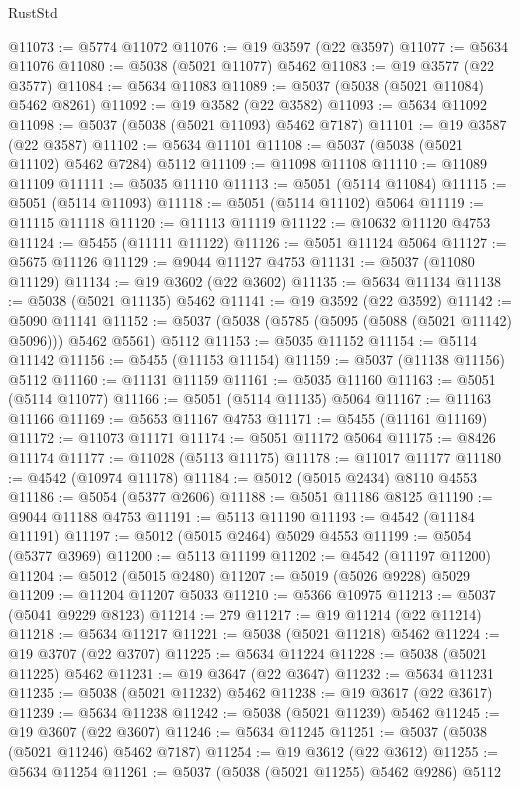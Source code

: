 \begin{lexlean}{RustStd}
\begin{coremodule}
@11073 := @5774 @11072
@11076 := @19 @3597 (@22 @3597)
@11077 := @5634 @11076
@11080 := @5038 (@5021 @11077) @5462
@11083 := @19 @3577 (@22 @3577)
@11084 := @5634 @11083
@11089 := @5037 (@5038 (@5021 @11084) @5462 @8261)
@11092 := @19 @3582 (@22 @3582)
@11093 := @5634 @11092
@11098 := @5037 (@5038 (@5021 @11093) @5462 @7187)
@11101 := @19 @3587 (@22 @3587)
@11102 := @5634 @11101
@11108 := @5037 (@5038 (@5021 @11102) @5462 @7284) @5112
@11109 := @11098 @11108
@11110 := @11089 @11109
@11111 := @5035 @11110
@11113 := @5051 (@5114 @11084)
@11115 := @5051 (@5114 @11093)
@11118 := @5051 (@5114 @11102) @5064
@11119 := @11115 @11118
@11120 := @11113 @11119
@11122 := @10632 @11120 @4753
@11124 := @5455 (@11111 @11122)
@11126 := @5051 @11124 @5064
@11127 := @5675 @11126
@11129 := @9044 @11127 @4753
@11131 := @5037 (@11080 @11129)
@11134 := @19 @3602 (@22 @3602)
@11135 := @5634 @11134
@11138 := @5038 (@5021 @11135) @5462
@11141 := @19 @3592 (@22 @3592)
@11142 := @5090 @11141
@11152 := @5037 (@5038 (@5785 (@5095 (@5088 (@5021 @11142) @5096))) @5462 @5561) @5112
@11153 := @5035 @11152
@11154 := @5114 @11142
@11156 := @5455 (@11153 @11154)
@11159 := @5037 (@11138 @11156) @5112
@11160 := @11131 @11159
@11161 := @5035 @11160
@11163 := @5051 (@5114 @11077)
@11166 := @5051 (@5114 @11135) @5064
@11167 := @11163 @11166
@11169 := @5653 @11167 @4753
@11171 := @5455 (@11161 @11169)
@11172 := @11073 @11171
@11174 := @5051 @11172 @5064
@11175 := @8426 @11174
@11177 := @11028 (@5113 @11175)
@11178 := @11017 @11177
@11180 := @4542 (@10974 @11178)
@11184 := @5012 (@5015 @2434) @8110 @4553
@11186 := @5054 (@5377 @2606)
@11188 := @5051 @11186 @8125
@11190 := @9044 @11188 @4753
@11191 := @5113 @11190
@11193 := @4542 (@11184 @11191)
@11197 := @5012 (@5015 @2464) @5029 @4553
@11199 := @5054 (@5377 @3969)
@11200 := @5113 @11199
@11202 := @4542 (@11197 @11200)
@11204 := @5012 (@5015 @2480)
@11207 := @5019 (@5026 @9228) @5029
@11209 := @11204 @11207 @5033
@11210 := @5366 @10975
@11213 := @5037 (@5041 @9229 @8123)
@11214 := 279
@11217 := @19 @11214 (@22 @11214)
@11218 := @5634 @11217
@11221 := @5038 (@5021 @11218) @5462
@11224 := @19 @3707 (@22 @3707)
@11225 := @5634 @11224
@11228 := @5038 (@5021 @11225) @5462
@11231 := @19 @3647 (@22 @3647)
@11232 := @5634 @11231
@11235 := @5038 (@5021 @11232) @5462
@11238 := @19 @3617 (@22 @3617)
@11239 := @5634 @11238
@11242 := @5038 (@5021 @11239) @5462
@11245 := @19 @3607 (@22 @3607)
@11246 := @5634 @11245
@11251 := @5037 (@5038 (@5021 @11246) @5462 @7187)
@11254 := @19 @3612 (@22 @3612)
@11255 := @5634 @11254
@11261 := @5037 (@5038 (@5021 @11255) @5462 @9286) @5112

\end{coremodule}
\end{lexlean}
